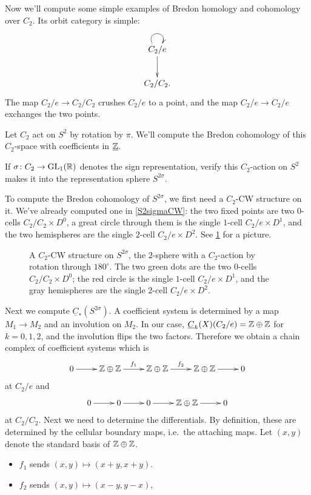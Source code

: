 Now we'll compute some simple examples of Bredon homology and cohomology over $C_2$. Its orbit category is simple:
\begin{equation}
\label{C2orbit}
\gathxy{
	C_2/e\ar[d]\ar@(ul, ur)_{}\\
	C_2/C_2.
}
\end{equation}
The map $C_2/e\to C_2/C_2$ crushes $C_2/e$ to a point, and the map $C_2/e\to C_2/e$ exchanges the two
points.
\begin{exm}
\label{2sigmaBC}
Let $C_2$ act on $S^2$ by rotation by $\pi$. We'll compute the Bredon cohomology of this $C_2$-space with
coefficients in $\underline{\mathbb Z}$.
\begin{ex}
If $\sigma\colon C_2\to\mathrm{GL}_1(\mathbb R)$ denotes the sign representation, verify this $C_2$-action on $S^2$ makes it into
the representation sphere $S^{2\sigma}$.
\end{ex}
To compute the Bredon cohomology of $S^{2\sigma}$, we first need a $C_2$-CW structure on it. We've already computed
one in \cref{S2sigmaCW}: the two fixed points are two $0$-cells $C_2/C_2\times D^0$, a great circle through them is
the single $1$-cell $C_2/e\times D^1$, and the two hemispheres are the single $2$-cell $C_2/e\times D^2$. See
\cref{S2CWrotation} for a picture.
\begin{figure}[h!]
\caption{A $C_2$-CW structure on $S^{2\sigma}$, the $2$-sphere with a $C_2$-action by rotation through $180^\circ$.
The two green dots are the two $0$-cells $C_2/C_2\times D^0$; the red circle is the single $1$-cell $C_2/e\times
D^1$, and the gray hemispheres are the single $2$-cell $C_2/e\times D^2$.}
\label{S2CWrotation}
\end{figure}

Next we compute $\underline C_*(S^{2\sigma})$. A coefficient system is determined by a map $M_1\to M_2$ and an
involution on $M_2$. In our case, $\underline C_k(X)(C_2/e) = \mathbb Z\oplus\mathbb Z$ for $k = 0,1,2$, and the involution flips
the two factors.  Therefore we obtain a chain complex of coefficient systems which is
\[
\shortexact[f_1][f_2]{\Z\oplus\Z}{\Z\oplus\Z}{\Z\oplus\Z}{}
\]
at $C_2/e$ and
\begin{equation}
\label{C_2/C_2}
\shortexact{0}{0}{\Z\oplus\Z}{}
\end{equation}
at $C_2/C_2$.
Next we need to determine the differentials.  By definition, these are determined by the cellular boundary maps, i.e.\ the attaching maps. Let $(x,y)$ denote the standard basis of $\mathbb Z\oplus\mathbb Z$.
\begin{itemize}
	\item $f_1$ sends $(x,y)\mapsto (x+y, x+y)$.
	\item $f_2$ sends $(x,y)\mapsto (x-y, y-x)$, 
\end{itemize}


\end{exm}

